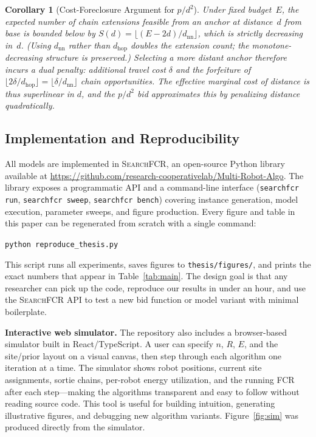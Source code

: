 \documentclass[conference]{IEEEtran}
\newtheorem{corollary}[theorem]{Corollary}
\begin{document}
\begin{corollary}[Cost-Foreclosure Argument for $p/d^2$]\label{cor:foreclosure}
Under fixed budget~$E$, the expected number of chain extensions feasible from
an anchor at distance~$d$ from base is bounded below by
$S(d) = \lfloor (E - 2d) / d_{\mathrm{nn}} \rfloor$,
which is strictly decreasing in~$d$.
(Using $d_{\mathrm{nn}}$ rather than $d_{\mathrm{hop}}$ doubles the extension
count; the monotone-decreasing structure is preserved.)
Selecting a more distant anchor therefore incurs a dual penalty: additional
travel cost $\delta$ \emph{and} the forfeiture of
$\lfloor 2\delta/d_{\mathrm{hop}} \rfloor = \lfloor\delta/d_{\mathrm{nn}}\rfloor$
chain opportunities.
The effective marginal cost of distance is thus superlinear in $d$,
and the $p/d^2$ bid approximates this by penalizing distance quadratically.
\end{corollary}

\subsection{Implementation and Reproducibility}\label{sec:impl}

All models are implemented in \textsc{SearchFCR}, an open-source Python
library available at
\url{https://github.com/research-cooperativelab/Multi-Robot-Algo}.
The library exposes a programmatic API and a command-line interface
(\texttt{searchfcr run}, \texttt{searchfcr sweep}, \texttt{searchfcr bench})
covering instance generation, model execution, parameter sweeps, and figure
production.
Every figure and table in this paper can be regenerated from scratch with
a single command:
\begin{center}
  \texttt{python reproduce\_thesis.py}
\end{center}
This script runs all experiments, saves figures to \texttt{thesis/figures/},
and prints the exact numbers that appear in Table~\ref{tab:main}.
The design goal is that any researcher can pick up the code, reproduce our
results in under an hour, and use the \textsc{SearchFCR} API to test a
new bid function or model variant with minimal boilerplate.

\textbf{Interactive web simulator.}
The repository also includes a browser-based simulator built in
React/TypeScript.
A user can specify $n$, $R$, $E$, and the site/prior layout on a visual
canvas, then step through each algorithm one iteration at a time.
The simulator shows robot positions, current site assignments, sortie chains,
per-robot energy utilization, and the running FCR after each step---making
the algorithms transparent and easy to follow without reading source code.
This tool is useful for building intuition, generating illustrative figures,
and debugging new algorithm variants.
Figure~\ref{fig:sim} was produced directly from the simulator.
\end{document}
